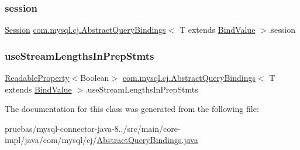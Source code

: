 \subsubsection{\texorpdfstring{session}{session}}
{\footnotesize\ttfamily \mbox{\hyperlink{interfacecom_1_1mysql_1_1cj_1_1_session}{Session}} \mbox{\hyperlink{classcom_1_1mysql_1_1cj_1_1_abstract_query_bindings}{com.\+mysql.\+cj.\+Abstract\+Query\+Bindings}}$<$ T extends \mbox{\hyperlink{interfacecom_1_1mysql_1_1cj_1_1_bind_value}{Bind\+Value}} $>$.session\hspace{0.3cm}{\ttfamily [protected]}}

\mbox{\label{classcom_1_1mysql_1_1cj_1_1_abstract_query_bindings_ac3e991801df757e24b6885db0c2301d8}} 
\subsubsection{\texorpdfstring{use\+Stream\+Lengths\+In\+Prep\+Stmts}{useStreamLengthsInPrepStmts}}
{\footnotesize\ttfamily \mbox{\hyperlink{interfacecom_1_1mysql_1_1cj_1_1conf_1_1_readable_property}{Readable\+Property}}$<$Boolean$>$ \mbox{\hyperlink{classcom_1_1mysql_1_1cj_1_1_abstract_query_bindings}{com.\+mysql.\+cj.\+Abstract\+Query\+Bindings}}$<$ T extends \mbox{\hyperlink{interfacecom_1_1mysql_1_1cj_1_1_bind_value}{Bind\+Value}} $>$.use\+Stream\+Lengths\+In\+Prep\+Stmts\hspace{0.3cm}{\ttfamily [protected]}}



The documentation for this class was generated from the following file\+:\begin{DoxyCompactItemize}
\item 
pruebas/mysql-\/connector-\/java-\/8../src/main/core-\/impl/java/com/mysql/cj/\mbox{\hyperlink{_abstract_query_bindings_8java}{Abstract\+Query\+Bindings.\+java}}\end{DoxyCompactItemize}
